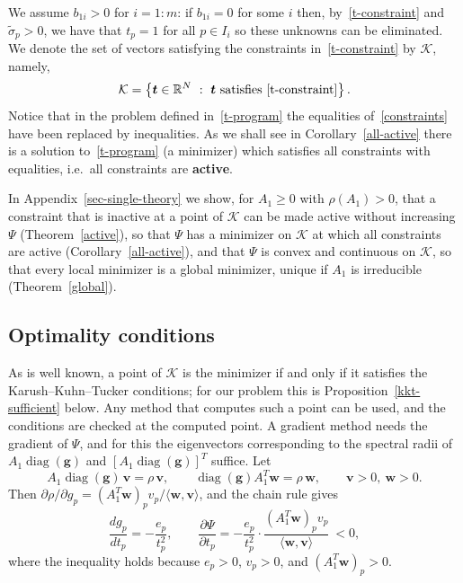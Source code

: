 \documentclass[11pt]{article}
\theoremstyle{plain}
\theoremstyle{definition}
\theoremstyle{remark}
\numberwithin{equation}{section}
\numberwithin{figure}{section}
\numberwithin{table}{section}
\numberwithin{algorithm}{section}
\begin{document}
We assume $b_{1i}>0$ for $i=1:m$: if $b_{1i}=0$ for some $i$ then,
by~\eqref{t-constraint} and $\widetilde\sigma_p>0$, we have that $t_p=1$ for all
$p\in I_i$ so these unknowns can be eliminated. We denote the set of vectors satisfying
the constraints in~\eqref{t-constraint} by $\mathcal{K}$, namely,
\begin{equation}\label{Kt-def}
\mathcal{K}=\left\{\bm t\in\mathbb{R}^N\ :\ \bm t\ \mbox{satisfies~\eqref{t-constraint}}\right\}.
\end{equation}
Notice that in the problem defined in~\eqref{t-program} the equalities
of~\eqref{constraints} have been replaced by inequalities. As we shall see in
Corollary~\ref{all-active} there is a solution to~\eqref{t-program} (a
minimizer) which satisfies all constraints
with equalities, i.e.\ all constraints are {\bf active}.

In Appendix~\ref{sec-single-theory} we show, for $A_1\ge 0$ with
$\rho(A_1)>0$, that a constraint that is inactive at a point of $\mathcal{K}$
can be made active without increasing $\Psi$ (Theorem~\ref{active}), so that
$\Psi$ has a minimizer on $\mathcal{K}$ at which all constraints are active
(Corollary~\ref{all-active}), and that $\Psi$ is convex and continuous on
$\mathcal{K}$, so that every local minimizer is a global minimizer, unique if
$A_1$ is irreducible (Theorem~\ref{global}).

\subsection{Optimality conditions}\label{sec-algorithm}

As is well known, a point of $\mathcal{K}$ is the minimizer if and only if it
satisfies the Karush--Kuhn--Tucker conditions; for our problem this is
Proposition~\ref{kkt-sufficient} below. Any method that computes such a point
can be used, and the conditions are checked at the computed point. A gradient method needs the gradient of
$\Psi$, and for this the eigenvectors corresponding to the spectral
radii of $A_1\operatorname{diag}(\bm g)$ and
$\left[A_1\operatorname{diag}(\bm g)\right]^T$ suffice. Let
\begin{equation}\label{perron}
A_1\operatorname{diag}(\bm g)\,\bm v=\rho\,\bm v,\qquad
\operatorname{diag}(\bm g)A_1^T\bm w=\rho\,\bm w,\qquad \bm v>0,\ \bm w>0 .
\end{equation}
Then
$\partial\rho/\partial g_p=\left(A_1^T\bm w\right)_pv_p/\langle\bm w,\bm v\rangle$,
and the chain rule gives
\begin{equation}\label{grad}
\frac{dg_p}{dt_p}=-\frac{e_p}{t_p^2},\qquad
\frac{\partial\Psi}{\partial t_p}
=-\frac{e_p}{t_p^2}\cdot
\frac{\left(A_1^T\bm w\right)_p v_p}{\langle\bm w,\bm v\rangle}\ <0 ,
\end{equation}
where the inequality holds because $e_p>0$, $v_p>0$, and
$\left(A_1^T\bm w\right)_p>0$.
\end{document}

